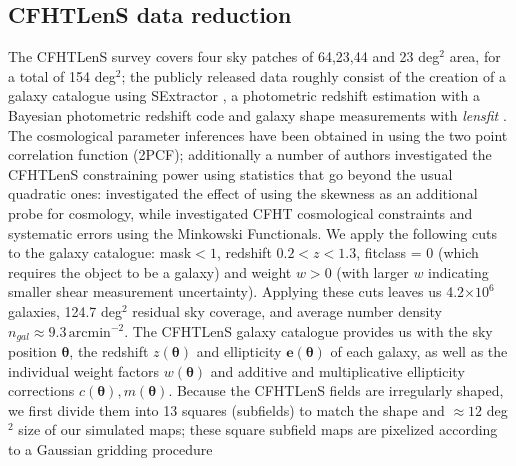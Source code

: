 \documentclass[reprint,aps,prd,superscriptaddress,showkeys,showpacs]{revtex4-1}
\begin{document}
\subsection{CFHTLenS data reduction}
\label{cfhtdatareduction}
%
The CFHTLenS survey covers four sky patches of 64,23,44 and 23 deg$^2$ area, for a total of 154 deg$^2$; the publicly released data roughly consist of the creation of a galaxy catalogue using SExtractor \citep{SExtractor}, a photometric redshift estimation with a Bayesian photometric redshift code \citep{PhotoCode} and galaxy shape measurements with \textit{lensfit} \citep{cfht1,cfht2}. The cosmological parameter inferences have been obtained in \citep{CFHTKilbinger} using the two point correlation function (2PCF); additionally a number of authors investigated the CFHTLenS constraining power using statistics that go beyond the usual quadratic ones: \citep{CFHTFu} investigated the effect of using the skewness as an additional probe for cosmology, while \citep{CFHTMasato} investigated CFHT cosmological constraints and systematic errors using the Minkowski Functionals. We apply the following cuts to the galaxy catalogue: mask$<1$, redshift $0.2 < z < 1.3$, fitclass = 0 (which requires the object to be a galaxy) and weight $w>0$ (with larger $w$ indicating smaller shear measurement uncertainty). Applying these cuts leaves us 4.2$\times10^6$ galaxies, 124.7 deg$^2$ residual sky coverage, and average number density $n_{gal} \approx 9.3\,\mathrm{arcmin}^{-2}$. The CFHTLenS galaxy catalogue provides us with the sky position $\pmb{\theta}$, the redshift $z(\pmb{\theta})$ and ellipticity $\mathbf{e}(\pmb{\theta})$ of each galaxy, as well as the individual weight factors $w(\pmb{\theta})$ and additive and multiplicative ellipticity corrections $c(\pmb{\theta}),m(\pmb{\theta})$. Because the CFHTLenS fields are irregularly shaped, we first divide them into 13 squares (subfields) to match the shape and $\approx12$ deg$^2$ size of our simulated maps; these square subfield maps are pixelized according to a Gaussian gridding procedure
\end{document}
